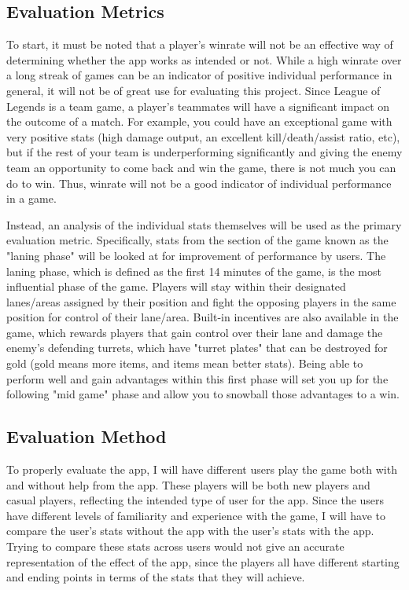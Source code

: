 \documentclass[10pt,twocolumn]{article}
\begin{document}
\subsection{Evaluation Metrics}
To start, it must be noted that a player's winrate will not be an effective way of determining whether the app works as intended or not.
While a high winrate over a long streak of games can be an indicator of positive individual performance in general, it will not be of great use for evaluating this project.
Since League of Legends is a team game, a player's teammates will have a significant impact on the outcome of a match.
For example, you could have an exceptional game with very positive stats (high damage output, an excellent kill/death/assist ratio, etc), but if the rest of your team is underperforming significantly and giving the enemy team an opportunity to come back and win the game, there is not much you can do to win.
Thus, winrate will not be a good indicator of individual performance in a game.

Instead, an analysis of the individual stats themselves will be used as the primary evaluation metric.
Specifically, stats from the section of the game known as the "laning phase" will be looked at for improvement of performance by users.
The laning phase, which is defined as the first 14 minutes of the game, is the most influential phase of the game.
Players will stay within their designated lanes/areas assigned by their position and fight the opposing players in the same position for control of their lane/area.
Built-in incentives are also available in the game, which rewards players that gain control over their lane and damage the enemy's defending turrets, which have "turret plates" that can be destroyed for gold (gold means more items, and items mean better stats).
Being able to perform well and gain advantages within this first phase will set you up for the following "mid game" phase and allow you to snowball those advantages to a win.

\subsection{Evaluation Method}
To properly evaluate the app, I will have different users play the game both with and without help from the app.
These players will be both new players and casual players, reflecting the intended type of user for the app.
Since the users have different levels of familiarity and experience with the game, I will have to compare the user's stats without the app with the user's stats with the app.
Trying to compare these stats across users would not give an accurate representation of the effect of the app, since the players all have different starting and ending points in terms of the stats that they will achieve.
\end{document}
